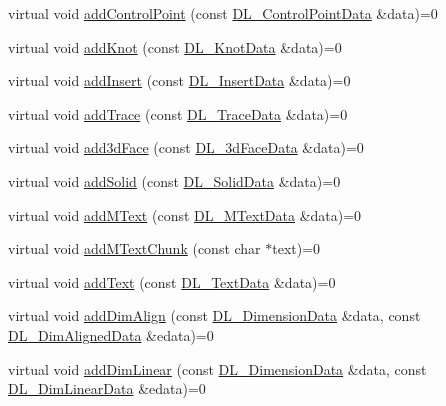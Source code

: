 \begin{DoxyCompactItemize}
\item 
virtual void \hyperlink{classDL__CreationInterface_ae96c9c9f9443600dc8fa9c4e06fe1580}{add\-Control\-Point} (const \hyperlink{structDL__ControlPointData}{D\-L\-\_\-\-Control\-Point\-Data} \&data)=0
\item 
virtual void \hyperlink{classDL__CreationInterface_aee48f189d80ce699ccea05766fe12f46}{add\-Knot} (const \hyperlink{structDL__KnotData}{D\-L\-\_\-\-Knot\-Data} \&data)=0
\item 
virtual void \hyperlink{classDL__CreationInterface_a2b4be5fe52dc83159c12ff468f176504}{add\-Insert} (const \hyperlink{structDL__InsertData}{D\-L\-\_\-\-Insert\-Data} \&data)=0
\item 
virtual void \hyperlink{classDL__CreationInterface_a8ebdc2a6b50d0d10ee1d9bfbdc45ee9d}{add\-Trace} (const \hyperlink{structDL__TraceData}{D\-L\-\_\-\-Trace\-Data} \&data)=0
\item 
virtual void \hyperlink{classDL__CreationInterface_a12cd3603b6bd5373c414788ae73191c9}{add3d\-Face} (const \hyperlink{structDL__TraceData}{D\-L\-\_\-3d\-Face\-Data} \&data)=0
\item 
virtual void \hyperlink{classDL__CreationInterface_a16e06e659acbfb4e3647690b01b9e308}{add\-Solid} (const \hyperlink{structDL__TraceData}{D\-L\-\_\-\-Solid\-Data} \&data)=0
\item 
virtual void \hyperlink{classDL__CreationInterface_aa2ec7bd71757de16657f04de9084961b}{add\-M\-Text} (const \hyperlink{structDL__MTextData}{D\-L\-\_\-\-M\-Text\-Data} \&data)=0
\item 
virtual void \hyperlink{classDL__CreationInterface_a3066271e07e5d63aca7fa23698e5bb49}{add\-M\-Text\-Chunk} (const char $\ast$text)=0
\item 
virtual void \hyperlink{classDL__CreationInterface_a7278cb1ca5256f9dde83b2e19ffd294a}{add\-Text} (const \hyperlink{structDL__TextData}{D\-L\-\_\-\-Text\-Data} \&data)=0
\item 
virtual void \hyperlink{classDL__CreationInterface_a3250c8f044343c42040c805d26f75593}{add\-Dim\-Align} (const \hyperlink{structDL__DimensionData}{D\-L\-\_\-\-Dimension\-Data} \&data, const \hyperlink{structDL__DimAlignedData}{D\-L\-\_\-\-Dim\-Aligned\-Data} \&edata)=0
\item 
virtual void \hyperlink{classDL__CreationInterface_a95ad1a05beacc28f43096792db4a2278}{add\-Dim\-Linear} (const \hyperlink{structDL__DimensionData}{D\-L\-\_\-\-Dimension\-Data} \&data, const \hyperlink{structDL__DimLinearData}{D\-L\-\_\-\-Dim\-Linear\-Data} \&edata)=0
\item 

\end{DoxyCompactItemize}
